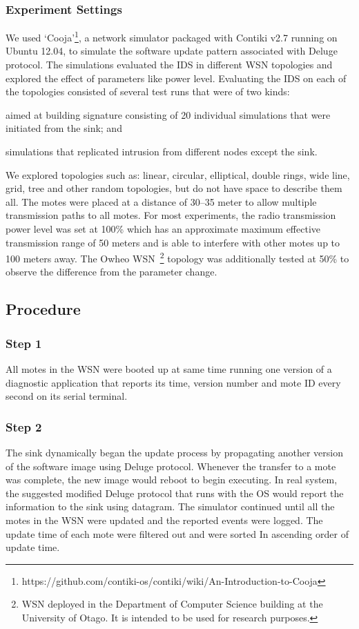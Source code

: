 \documentclass[conference]{IEEEtran}
\begin{document}
\subsubsection*{Experiment Settings}
\label{subsec:sim_env} 
We used `Cooja'\footnote{https://github.com/contiki-os/contiki/wiki/An-Introduction-to-Cooja}, a network simulator packaged with Contiki v2.7 running on Ubuntu 12.04, to simulate the software update pattern associated with Deluge protocol.
The simulations evaluated the IDS in different WSN topologies and explored the effect of parameters like power level.
Evaluating the IDS on each of the topologies consisted of several test runs that  were of two kinds: 
\begin{inparaenum}
\item aimed at building signature consisting of 20 individual simulations that were initiated from the sink; and
\item simulations that replicated intrusion from different nodes except the sink.
\end{inparaenum}
We explored topologies such as: linear, circular, elliptical, double rings, wide line, grid, tree and other random topologies, but do not have space to describe them all.
The motes were placed at a distance of 30--35 meter to allow  multiple transmission paths to all motes. 
For most experiments, the radio transmission power level was set at 100\% which has an approximate maximum effective transmission range of 50 meters and is able to interfere with other motes up to 100 meters away.
The Owheo WSN~\footnote{WSN deployed in the Department of Computer Science building at the University of Otago. It is intended to be used for research purposes.} topology was additionally tested at 50\%  to observe the difference from the parameter change.

\subsection*{Procedure}
\label{subsec:proc}

\subsubsection*{Step 1} 
All motes in the WSN were booted up at same time running one version of a diagnostic application that reports its time, version number and mote ID every second on its serial terminal. 

\subsubsection*{Step 2} 
The sink dynamically began the update process by propagating another version of the software image using Deluge protocol. %
Whenever the transfer to a mote was complete, the new image would  reboot to begin executing.
In real system, the suggested modified Deluge protocol that runs with the OS would report the information to the sink using datagram.
The simulator continued until all the motes in the WSN were updated and the reported events were logged. 
The update time of each mote were filtered out  and were sorted In ascending order of update time.
\end{document}
